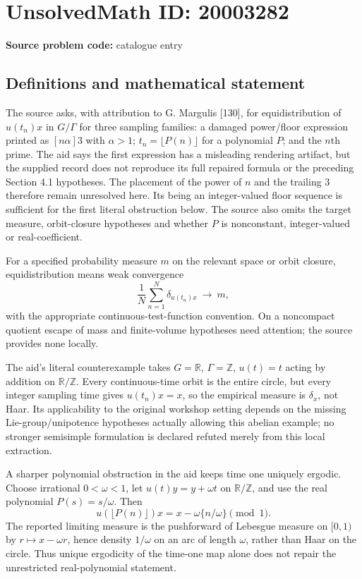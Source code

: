 \documentclass[11pt]{article}
\newcommand{\Z}{\mathbb{Z}}
\newcommand{\R}{\mathbb{R}}
\begin{document}
\section*{UnsolvedMath ID: 20003282}
\textbf{Source problem code:} catalogue entry
\subsection{Definitions and mathematical statement}
The source asks, with attribution to G. Margulis [130], for equidistribution of $u(t_n)x$ in $G/\Gamma$ for three sampling families: a damaged power/floor expression printed as $[n\alpha]3$ with $\alpha>1$; $t_n=\lfloor P(n)\rfloor$ for a polynomial $P$; and the $n$th prime. The aid says the first expression has a misleading rendering artifact, but the supplied record does not reproduce its full repaired formula or the preceding Section 4.1 hypotheses. The placement of the power of $n$ and the trailing $3$ therefore remain unresolved here. Its being an integer-valued floor sequence is sufficient for the first literal obstruction below. The source also omits the target measure, orbit-closure hypotheses and whether $P$ is nonconstant, integer-valued or real-coefficient.

For a specified probability measure $m$ on the relevant space or orbit closure, equidistribution means weak convergence
\[
 \frac1N\sum_{n=1}^N\delta_{u(t_n)x}\ \longrightarrow\ m,
\]
with the appropriate continuous-test-function convention. On a noncompact quotient escape of mass and finite-volume hypotheses need attention; the source provides none locally.

The aid's literal counterexample takes $G=\R$, $\Gamma=\Z$, $u(t)=t$ acting by addition on $\R/\Z$. Every continuous-time orbit is the entire circle, but every integer sampling time gives $u(t_n)x=x$, so the empirical measure is $\delta_x$, not Haar. Its applicability to the original workshop setting depends on the missing Lie-group/unipotence hypotheses actually allowing this abelian example; no stronger semisimple formulation is declared refuted merely from this local extraction.

A sharper polynomial obstruction in the aid keeps time one uniquely ergodic. Choose irrational $0<\omega<1$, let $u(t)y=y+\omega t$ on $\R/\Z$, and use the real polynomial $P(s)=s/\omega$. Then
\[
 u(\lfloor P(n)\rfloor)x
 =x-\omega\{n/\omega\}\pmod1.
\]
The reported limiting measure is the pushforward of Lebesgue measure on $[0,1)$ by $r\mapsto x-\omega r$, hence density $1/\omega$ on an arc of length $\omega$, rather than Haar on the circle. Thus unique ergodicity of the time-one map alone does not repair the unrestricted real-polynomial statement.
\end{document}
